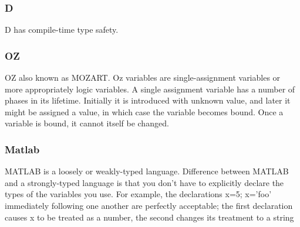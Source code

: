 \documentclass{sig-alternate}
\begin{document}
\subsubsection{D}
D has compile-time type safety. 
\subsubsection{OZ }
OZ also known as MOZART. Oz variables are single-assignment variables or more appropriately logic variables. A single assignment variable has a number of phases in its lifetime. Initially it is introduced with unknown value, and later it might be assigned a value, in which case the variable becomes bound. Once a variable is bound, it cannot itself be changed.
\subsubsection{Matlab}
MATLAB is a loosely or weakly-typed language. Difference between MATLAB and a strongly-typed language is that you don't have to explicitly declare the types of the variables you use. For example, the declarations x=5; x='foo' immediately following one another are perfectly acceptable; the first declaration causes x to be treated as a number, the second changes its treatment to a string
\end{document}
